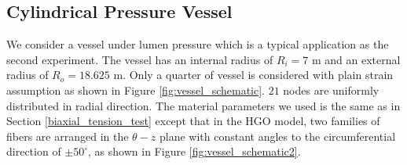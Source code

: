 \subsection{Cylindrical Pressure Vessel}
\label{pressure_vessel}
We consider a vessel under lumen pressure which is a typical application as the second experiment. The vessel has an internal radius of $R_i = 7$ m and an external radius of $R_o = 18.625$ m. Only a quarter of vessel is considered with plain strain assumption as shown in Figure \ref{fig:vessel_schematic}. $21$ nodes are uniformly distributed in radial direction. The material parameters we used is the same as in Section \ref{biaxial_tension_test} except that in the HGO model, two families of fibers are arranged in the $\theta-z$ plane with constant angles to the circumferential direction of $\pm 50^\circ$, as shown in Figure \ref{fig:vessel_schematic2}.

